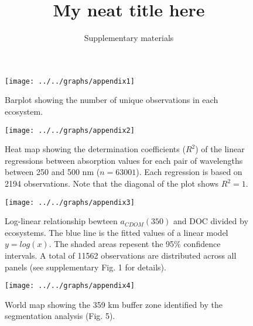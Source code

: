 \documentclass[10pt,a4paper]{scrartcl}
\title{My neat title here}
\subtitle{Supplementary materials}
\date{}
\begin{document}
\maketitle

\begin{figure}[h]
	\centering
	\texttt{[image: ../../graphs/appendix1]}
	\caption{Barplot showing the number of unique observations in each ecosystem.}
\end{figure}

\clearpage
\newpage




\clearpage
\newpage

\begin{figure}[h]
	\centering
	\texttt{[image: ../../graphs/appendix2]}
	\caption{Heat map showing the determination coefficients ($R^2$) of the linear regressions between absorption values for each pair of wavelengths between 250 and 500 nm ($n = 63001$). Each regression is based on 2194 observations. Note that the diagonal of the plot shows $R^2 = 1$.}
\end{figure}

\clearpage
\newpage

\begin{figure}[h]
	\centering
	\texttt{[image: ../../graphs/appendix3]}

	\caption{Log-linear relationship bewteen $a_{CDOM}(350)$ and DOC divided by ecosystems. The blue line is the fitted values of a linear model $y = log(x)$. The shaded areas repesent the 95\% confidence intervals. A total of 11562 observations are distributed across all panels (see supplementary Fig. 1 for details).}
\end{figure}

\clearpage
\newpage

\begin{figure}[h]
	\centering
	\texttt{[image: ../../graphs/appendix4]}
	\caption{World map showing the 359 km buffer zone identified by the segmentation analysis (Fig. 5).}
\end{figure}
\end{document}
